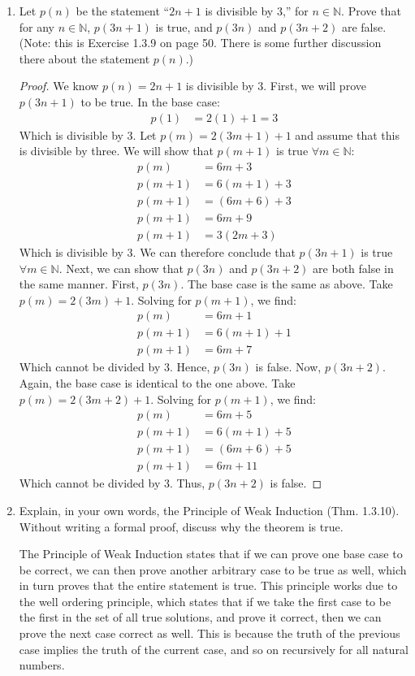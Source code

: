 \documentclass[12pt]{article}
\newcommand{\N}{\mathbb{N}}
\begin{document}
\begin{enumerate}
\item Let $p(n)$ be the statement ``$2n+1$ is divisible by $3$,'' for $n\in \N$. Prove that for any $n\in \N$, $p(3n+1)$ is true, and $p(3n)$ and $p(3n+2)$ are false. (Note: this is Exercise 1.3.9 on page 50. There is some further discussion there about the statement $p(n)$.)

\begin{proof}
We know $p(n) = 2n + 1$ is divisible by 3. First, we will prove $p(3n + 1)$ to be true. In the base case:
\begin{align*}
p(1) &= 2(1) + 1 = 3
\end{align*}
Which is divisible by 3. Let $p(m) = 2(3m + 1) + 1$ and assume that this is divisible by three. We will show that $p(m + 1)$ is true $\forall m \in \N$:
\begin{align*}
p(m) &= 6m + 3 \\
p(m + 1) &= 6(m + 1) + 3 \\
p(m + 1) &= (6m + 6) + 3 \\
p(m + 1) &= 6m + 9 \\
p(m + 1) &= 3(2m + 3) 
\end{align*}
Which is divisible by 3. We can therefore conclude that $p(3n + 1)$ is true $\forall m \in \N$. Next, we can show that $p(3n)$ and $p(3n+2)$ are both false in the same manner. First, $p(3n)$. The base case is the same as above. Take $p(m) = 2(3m) + 1$. Solving for $p(m + 1)$, we find:
\begin{align*}
p(m) &= 6m + 1 \\
p(m + 1) &= 6(m + 1) + 1 \\
p(m + 1) &= 6m + 7
\end{align*}
Which cannot be divided by 3. Hence, $p(3n)$ is false. Now, $p(3n + 2)$. Again, the base case is identical to the one above. Take $p(m) = 2(3m + 2) + 1$. Solving for $p(m + 1)$, we find:
\begin{align*}
p(m) &= 6m + 5 \\
p(m + 1) &= 6(m + 1) + 5 \\
p(m + 1) &= (6m + 6) + 5 \\
p(m + 1) &= 6m + 11 
\end{align*}
Which cannot be divided by 3. Thus, $p(3n + 2)$ is false. 
\end{proof}

\item Explain, in your own words, the Principle of Weak Induction (Thm. 1.3.10). Without writing a formal proof, discuss why the theorem is true.


The Principle of Weak Induction states that if we can prove one base case to be correct, we can then prove another arbitrary case to be true as well, which in turn proves that the entire statement is true. This principle works due to the well ordering principle, which states that if we take the first case to be the first in the set of all true solutions, and prove it correct, then we can prove the next case correct as well. This is because the truth of the previous case implies the truth of the current case, and so on recursively for all natural numbers. 

\end{enumerate}
\end{document}
